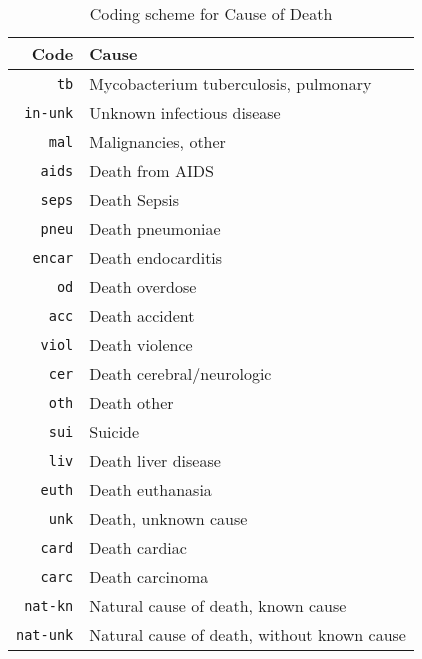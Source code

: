 \begin{table}[h]
  \caption{Coding scheme for Cause of Death}
  \label{tbl:cause-of-death}
  \begin{tabular}{rl}
    Code                & Cause \\ \hline
    \texttt{tb}         & Mycobacterium tuberculosis, pulmonary \\
    \texttt{in-unk}     & Unknown infectious disease \\
    \texttt{mal}        & Malignancies, other \\
    \texttt{aids}       & Death from AIDS \\
    \texttt{seps}       & Death Sepsis \\
    \texttt{pneu}       & Death pneumoniae \\
    \texttt{encar}      & Death endocarditis \\
    \texttt{od}         & Death overdose \\
    \texttt{acc}        & Death accident \\
    \texttt{viol}       & Death violence \\
    \texttt{cer}        & Death cerebral/neurologic \\
    \texttt{oth}        & Death other \\
    \texttt{sui}        & Suicide \\
    \texttt{liv}        & Death liver disease \\
    \texttt{euth}       & Death euthanasia \\
    \texttt{unk}        & Death, unknown cause \\
    \texttt{card}       & Death cardiac \\
    \texttt{carc}       & Death carcinoma \\
    \texttt{nat-kn}     & Natural cause of death, known cause \\
    \texttt{nat-unk}    & Natural cause of death, without known cause \\
  \end{tabular}
\end{table}
